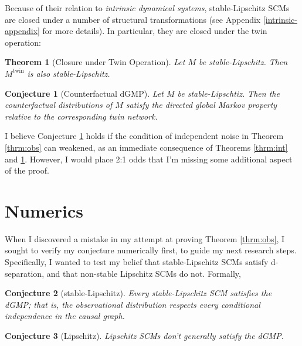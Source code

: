 \documentclass[letterpaper,10pt]{article}
\newtheorem{theorem}{Theorem}
\newtheorem{conjecture}{Conjecture}
\begin{document}
Because of their relation to \emph{intrinsic dynamical systems}, stable-Lipschitz SCMs are closed under a number of structural transformations (see Appendix \ref{intrinsic-appendix} for more details). In particular, they are closed under the twin operation:

\begin{theorem}[Closure under Twin Operation] \label{twin}
Let $M$ be stable-Lipschitz. Then $M^{\text{twin}}$ is also stable-Lipschitz.
\end{theorem}

\begin{conjecture}[Counterfactual dGMP] \label{thrm:counter}
Let $M$ be stable-Lipschtiz. Then the counterfactual distributions of $M$ satisfy the directed global Markov property relative to the corresponding twin network.
\end{conjecture}

I believe Conjecture \ref{thrm:counter} holds if the condition of independent noise in Theorem \ref{thrm:obs} can weakened, as an immediate consequence of Theorems \ref{thrm:int} and \ref{twin}. However, I would place 2:1 odds that I'm missing some additional aspect of the proof.

\section{Numerics}\label{numerics}

When I discovered a mistake in my attempt at proving Theorem \ref{thrm:obs}, I sought to verify my conjecture numerically first, to guide my next research steps.
Specifically, I wanted to test my belief that stable-Lipschitz SCMs satisfy d-separation, and that non-stable Lipschitz SCMs do not.
Formally,

\begin{conjecture}[stable-Lipschitz]\label{conj:stable-Lipschitz}
Every stable-Lipschitz SCM satisfies the dGMP; that is, the observational distribution respects every conditional independence in the causal graph.
\end{conjecture}

\begin{conjecture}[Lipschitz]\label{conj:Lipschitz}
Lipschitz SCMs don’t generally satisfy the dGMP.
\end{conjecture}
\end{document}
